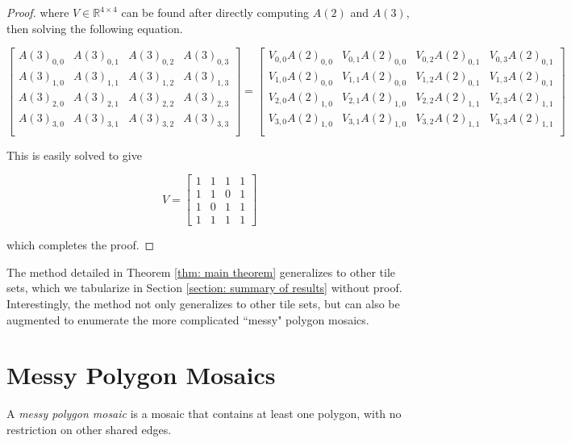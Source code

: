 \documentclass[12pt]{article}
\theoremstyle{plain}
\theoremstyle{definition}
\theoremstyle{remark}
\theoremstyle{definition}
\begin{document}
\begin{proof}
where $V \in \mathbb{R}^{4 \times 4}$ can be found after directly computing $A(2)$ and $A(3)$, then solving the following equation.

$$
\begin{bmatrix}
    A(3)_{0,0} & A(3)_{0,1} & A(3)_{0,2} & A(3)_{0,3} \\
    A(3)_{1,0} & A(3)_{1,1} & A(3)_{1,2} & A(3)_{1,3} \\
    A(3)_{2,0} & A(3)_{2,1} & A(3)_{2,2} & A(3)_{2,3} \\
    A(3)_{3,0} & A(3)_{3,1} & A(3)_{3,2} & A(3)_{3,3} \\
\end{bmatrix} = 
\begin{bmatrix}
    V_{0,0}A(2)_{0,0} & V_{0,1}A(2)_{0,0} & V_{0,2}A(2)_{0,1} & V_{0,3}A(2)_{0,1} \\
    V_{1,0}A(2)_{0,0} & V_{1,1}A(2)_{0,0} & V_{1,2}A(2)_{0,1} & V_{1,3}A(2)_{0,1} \\
    V_{2,0}A(2)_{1,0} & V_{2,1}A(2)_{1,0} & V_{2,2}A(2)_{1,1} & V_{2,3}A(2)_{1,1} \\
    V_{3,0}A(2)_{1,0} & V_{3,1}A(2)_{1,0} & V_{3,2}A(2)_{1,1} & V_{3,3}A(2)_{1,1} \\
\end{bmatrix}
$$

This is easily solved to give 

$$V = 
\begin{bmatrix} 
    1 & 1 & 1 & 1 \\ 
    1 & 1 & 0 & 1 \\ 
    1 & 0 & 1 & 1 \\ 
    1 & 1 & 1 & 1 
\end{bmatrix}
$$


which completes the proof.

\end{proof}

The method detailed in Theorem \ref{thm: main theorem} generalizes to other tile sets, which we tabularize in Section \ref{section: summary of results} without proof. Interestingly, the method not only generalizes to other tile sets, but can also be augmented to enumerate the more complicated ``messy" polygon mosaics.

\section{Messy Polygon Mosaics}

A \textit{messy polygon mosaic} is a mosaic that contains at least one polygon, with no restriction on other shared edges. 
\end{document}
